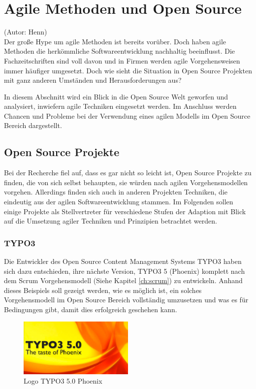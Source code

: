 \section{Agile Methoden und Open Source}
(Autor: Henn)\\

Der große Hype um agile Methoden ist bereits vorüber. Doch haben agile Methoden die herkömmliche Softwareentwicklung nachhaltig beeinflusst. Die Fachzeitschriften sind voll davon und in Firmen werden agile Vorgehensweisen immer häufiger umgesetzt. Doch wie sieht die Situation in Open Source Projekten mit ganz anderen Umständen und Herausforderungen aus?

In diesem Abschnitt wird ein Blick in die Open Source Welt geworfen und analysiert, inwiefern agile Techniken eingesetzt werden. Im Anschluss werden Chancen und Probleme bei der Verwendung eines agilen Modells im Open Source Bereich dargestellt.

\subsection{Open Source Projekte}
Bei der Recherche fiel auf, dass es gar nicht so leicht ist, Open Source Projekte zu finden, die von sich selbst behaupten, sie würden nach agilen Vorgehensmodellen vorgehen. Allerdings finden sich auch in anderen Projekten Techniken, die eindeutig aus der agilen Softwareentwicklung stammen. Im Folgenden sollen einige Projekte als Stellvertreter für verschiedene Stufen der Adaption mit Blick auf die Umsetzung agiler Techniken und Prinzipien betrachtet werden.

\subsubsection{TYPO3}
Die Entwickler des Open Source Content Management Systems TYPO3 haben sich dazu entschieden, ihre nächste Version, TYPO3 5 (Phoenix) komplett nach dem Scrum Vorgehensmodell  (Siehe Kapitel \ref{ch:scrum}) zu entwickeln. Anhand dieses Beispiels soll gezeigt werden, wie es möglich ist, ein solches Vorgehensmodell im Open Source Bereich vollständig umzusetzen und was es für Bedingungen gibt, damit dies erfolgreich geschehen kann.
\begin{figure}[h]
	\centering
	\includegraphics[width=0.5\textwidth]{images/typo3_Phoenix_logo.jpg}
	\caption{Logo TYPO3 5.0 Phoenix\cite{bib:phoenix-logo}}
	\label{Logo-Phoenix}
\end{figure}

